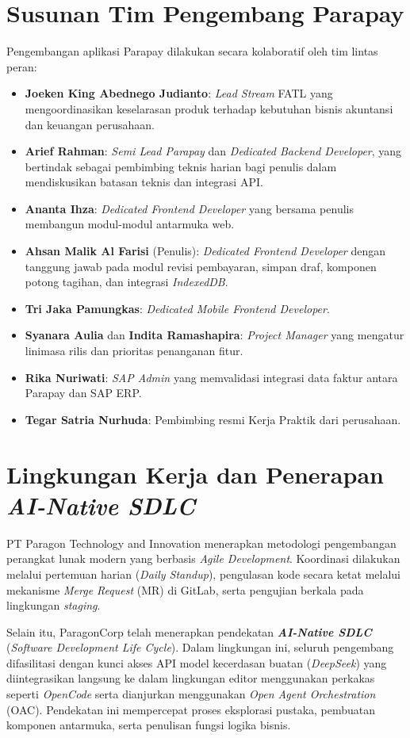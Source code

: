 \section{Susunan Tim Pengembang Parapay}
Pengembangan aplikasi Parapay dilakukan secara kolaboratif oleh tim lintas peran:
\begin{itemize}
  \item \textbf{Joeken King Abednego Judianto}: \textit{Lead Stream} FATL yang mengoordinasikan keselarasan produk terhadap kebutuhan bisnis akuntansi dan keuangan perusahaan.
  \item \textbf{Arief Rahman}: \textit{Semi Lead Parapay} dan \textit{Dedicated Backend Developer}, yang bertindak sebagai pembimbing teknis harian bagi penulis dalam mendiskusikan batasan teknis dan integrasi API.
  \item \textbf{Ananta Ihza}: \textit{Dedicated Frontend Developer} yang bersama penulis membangun modul-modul antarmuka web.
  \item \textbf{Ahsan Malik Al Farisi} (Penulis): \textit{Dedicated Frontend Developer} dengan tanggung jawab pada modul revisi pembayaran, simpan draf, komponen potong tagihan, dan integrasi \textit{IndexedDB}.
  \item \textbf{Tri Jaka Pamungkas}: \textit{Dedicated Mobile Frontend Developer}.
  \item \textbf{Syanara Aulia} dan \textbf{Indita Ramashapira}: \textit{Project Manager} yang mengatur linimasa rilis dan prioritas penanganan fitur.
  \item \textbf{Rika Nuriwati}: \textit{SAP Admin} yang memvalidasi integrasi data faktur antara Parapay dan SAP ERP.
  \item \textbf{Tegar Satria Nurhuda}: Pembimbing resmi Kerja Praktik dari perusahaan.
\end{itemize}

\section{Lingkungan Kerja dan Penerapan \textit{AI-Native SDLC}}
PT Paragon Technology and Innovation menerapkan metodologi pengembangan perangkat lunak modern yang berbasis \textit{Agile Development}. Koordinasi dilakukan melalui pertemuan harian (\textit{Daily Standup}), pengulasan kode secara ketat melalui mekanisme \textit{Merge Request} (MR) di GitLab, serta pengujian berkala pada lingkungan \textit{staging}.

Selain itu, ParagonCorp telah menerapkan pendekatan \textbf{\textit{AI-Native SDLC}} (\textit{Software Development Life Cycle}). Dalam lingkungan ini, seluruh pengembang difasilitasi dengan kunci akses API model kecerdasan buatan (\textit{DeepSeek}) yang diintegrasikan langsung ke dalam lingkungan editor menggunakan perkakas seperti \textit{OpenCode} serta dianjurkan menggunakan \textit{Open Agent Orchestration} (OAC). Pendekatan ini mempercepat proses eksplorasi pustaka, pembuatan komponen antarmuka, serta penulisan fungsi logika bisnis.


